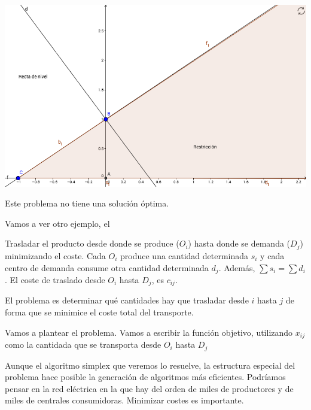 \begin{example}
\begin{ioprob} 
\end{ioprob}

\begin{center}
\includegraphics[scale=0.45]{img/io-intro_3.png}
\end{center}

Este problema no tiene una solución óptima.
\end{example}


Vamos a ver otro ejemplo, el 
\begin{example}
Trasladar el producto desde donde se produce ($O_i$) hasta donde se demanda ($D_j$) minimizando el coste. 
Cada $O_i$ produce una cantidad determinada $s_i$ y cada centro de demanda consume otra cantidad determinada $d_j$.
Además, $\sum s_i = \sum d_i$.
El coste de traslado desde $O_i$ hasta $D_j$, es $c_{ij}$. 

El problema es determinar qué cantidades hay que trasladar desde $i$ hasta $j$ de forma que se minimice el coste total del transporte.


Vamos a plantear el problema. Vamos a escribir la función objetivo, utilizando $x_{ij}$ como la cantidada que se transporta desde $O_i$ hasta $D_j$

\begin{ioprob}
\end{ioprob}

Aunque el algoritmo simplex que veremos lo resuelve, la estructura especial del problema hace posible la generación de algoritmos más eficientes. 
Podríamos pensar en la red eléctrica en la que hay del orden de miles de productores y de miles de centrales consumidoras. 
Minimizar costes es importante.
\end{example}

